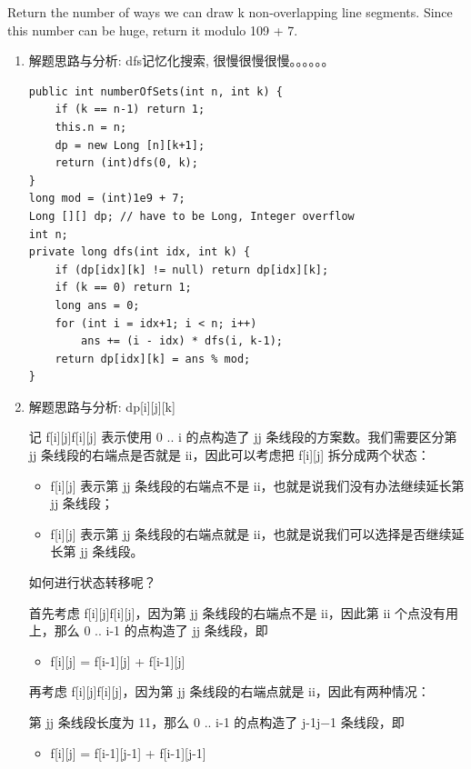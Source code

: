 \documentclass[9pt, b5paaper]{book}
\begin{document}
Return the number of ways we can draw k non-overlapping line segments. Since this number can be huge, return it modulo 109 + 7.
\begin{enumerate}
\item 解题思路与分析: dfs记忆化搜索, 很慢很慢很慢。。。。。。
\label{sec-1-5-5-1}
\begin{verbatim}
public int numberOfSets(int n, int k) { 
    if (k == n-1) return 1;
    this.n = n;
    dp = new Long [n][k+1];
    return (int)dfs(0, k);
}
long mod = (int)1e9 + 7;
Long [][] dp; // have to be Long, Integer overflow
int n;
private long dfs(int idx, int k) {
    if (dp[idx][k] != null) return dp[idx][k];
    if (k == 0) return 1;
    long ans = 0;
    for (int i = idx+1; i < n; i++)
        ans += (i - idx) * dfs(i, k-1);
    return dp[idx][k] = ans % mod;
}
\end{verbatim}
\item 解题思路与分析: dp[i][j][k]
\label{sec-1-5-5-2}

记 f[i][j]f[i][j] 表示使用 0 .. i 的点构造了 jj 条线段的方案数。我们需要区分第 jj 条线段的右端点是否就是 ii，因此可以考虑把 f[i][j] 拆分成两个状态：

\begin{itemize}
\item f[i][j]\footnotemark[1]{} 表示第 jj 条线段的右端点不是 ii，也就是说我们没有办法继续延长第 jj 条线段；
\item f[i][j]\footnotemark[2]{} 表示第 jj 条线段的右端点就是 ii，也就是说我们可以选择是否继续延长第 jj 条线段。
\end{itemize}

如何进行状态转移呢？

首先考虑 f[i][j]\footnotemark[1]{}f[i][j]\footnotemark[1]{}，因为第 jj 条线段的右端点不是 ii，因此第 ii 个点没有用上，那么 0 .. i-1 的点构造了 jj 条线段，即

\begin{itemize}
\item f[i][j]\footnotemark[1]{} = f[i-1][j]\footnotemark[1]{} + f[i-1][j]\footnotemark[2]{}
\end{itemize}

再考虑 f[i][j]\footnotemark[2]{}f[i][j]\footnotemark[2]{}，因为第 jj 条线段的右端点就是 ii，因此有两种情况：

第 jj 条线段长度为 11，那么 0 .. i-1 的点构造了 j-1j−1 条线段，即

\begin{itemize}
\item f[i][j]\footnotemark[2]{} = f[i-1][j-1]\footnotemark[1]{} + f[i-1][j-1]\footnotemark[2]{}
\end{itemize}


\end{enumerate}
\end{document}
